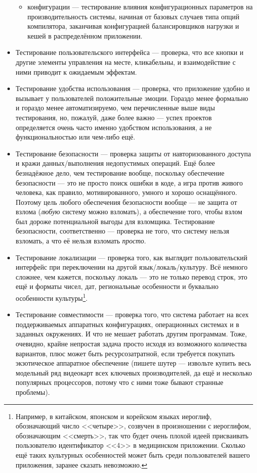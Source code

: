 \documentclass{../../text-style}
\begin{document}
\begin{itemize}
\begin{itemize}
        \item конфигурации --- тестирование влияния конфигурационных параметров на производительность системы, начиная от базовых случаев типа опций компилятора, заканчивая конфигурацией балансировщиков нагрузки и кешей в распределённом приложении.
    \end{itemize}
    \item Тестирование пользовательского интерфейса --- проверка, что все кнопки и другие элементы управления на месте, кликабельны, и взаимодействие с ними приводит к ожидаемым эффектам.
    \item Тестирование удобства использования --- проверка, что приложение удобно и вызывает у пользователей положительные эмоции. Гораздо менее формально и гораздо менее автоматизируемо, чем перечисленные выше виды тестирования, но, пожалуй, даже более важно --- успех проектов определяется очень часто именно удобством использования, а не функциональностью или чем-либо ещё.
    \item Тестирование безопасности --- проверка защиты от навторизованного доступа и кражи данных/выполнения недопустимых операций. Ещё более безнадёжное дело, чем тестирование вообще, поскольку обеспечение безопасности --- это не просто поиск ошибки в коде, а игра против живого человека, как правило, мотивированного, умного и хорошо оснащённого. Поэтому цель любого обеспечения безопасности вообще --- не защита от взлома (\emph{любую} систему можно взломать), а обеспечение того, чтобы взлом был дороже потенциальной выгоды для взломщика. Тестирование безопасности, соответственно --- проверка не того, что систему нельзя взломать, а что её нельзя взломать \emph{просто}.
    \item Тестирование локализации --- проверка того, как выглядит пользовательский интерфейс при переключении на другой язык/локаль/культуру. Всё немного сложнее, чем кажется, поскольку локаль --- это не только перевод строк, это ещё и форматы чисел, дат, региональные особенности и буквально особенности культуры\footnote{Например, в китайском, японском и корейском языках иероглиф, обозначающий число <<четыре>>, созвучен в произношении с иероглифом, обозначающим <<смерть>>, так что будет очень плохой идеей присваивать пользователю идентификатор <<4>> в медицинском приложении. Сколько ещё таких культурных особенностей может быть среди пользователей вашего приложения, заранее сказать невозможно.}.
    \item Тестирование совместимости --- проверка того, что система работает на всех поддерживаемых аппаратных конфигурациях, операционных системах и в заданных окружениях. И что не мешает работать другим программам. Тоже, очевидно, крайне непростая задача просто исходя из возможного количества вариантов, плюс может быть ресурсозатратной, если требуется покупать экзотическое аппаратное обеспечение (пишете шутер --- извольте купить весь модельный ряд видеокарт всех ключевых производителей, да ещё и несколько популярных процессоров, потому что с ними тоже бывают странные проблемы).
\end{itemize}
\end{document}
